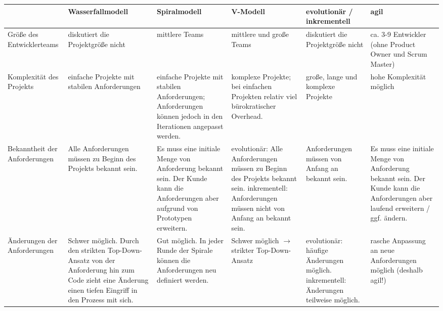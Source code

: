 \documentclass{bschlangaul-aufgabe}
\begin{document}
\begin{bAntwort}
\noindent
{\tiny
\begin{tabularx}{\linewidth}{>{\raggedright\arraybackslash}X||>{\raggedright\arraybackslash}X>{\raggedright\arraybackslash}X>{\raggedright\arraybackslash}X>{\raggedright\arraybackslash}X>{\raggedright\arraybackslash}X}
&
Wasserfallmodell &
Spiralmodell &
V-Modell &
evolutionär / inkrementell &
agil
\\\hline\hline

Größe des Entwicklerteams &
diskutiert die Projektgröße nicht & %
mittlere Teams & %
mittlere und große Teams & %
diskutiert die Projektgröße nicht & %
ca. 3-9 Entwickler (ohne Product Owner und Scrum Master) %
\\\hline

Komplexität des Projekts &
einfache Projekte mit stabilen Anforderungen & %
einfache Projekte mit stabilen Anforderungen; Anforderungen können
jedoch in den Iterationen angepasst werden. & %
komplexe Projekte; bei einfachen Projekten relativ viel bürokratischer
Overhead. & %
große, lange und komplexe Projekte & %
hohe Komplexität möglich %
\\\hline

Bekanntheit der Anforderungen &
Alle Anforderungen müssen zu Beginn des Projekts bekannt sein.
& %
Es muss eine initiale Menge von Anforderung bekannt sein. Der Kunde
kann die Anforderungen aber aufgrund von Prototypen erweitern.
& %
evolutionär: Alle Anforderungen müssen zu Beginn des Projekts bekannt
sein. inkrementell: Anforderungen müssen nicht von Anfang an bekannt
sein. & %
Anforderungen müssen von Anfang an bekannt sein.
& %
Es muss eine initiale Menge von Anforderung bekannt sein. Der Kunde
kann die Anforderungen aber laufend erweitern / ggf. ändern. %
\\\hline

Änderungen der Anforderungen &
Schwer möglich. Durch den strikten Top-Down-Ansatz von der Anforderung
hin zum Code zieht eine Änderung einen tiefen Eingriff in den
Prozess mit sich. & %
Gut möglich. In jeder Runde der Spirale können die Anforderungen neu
definiert werden. & %
Schwer möglich $\rightarrow$ strikter Top-Down-Ansatz & %
evolutionär: häufige Änderungen möglich. inkrementell: Änderungen
teilweise möglich. & %
rasche Anpassung an neue Anforderungen möglich (deshalb agil!) %
\\\hline


\end{tabularx}}
\end{bAntwort}
\end{document}
